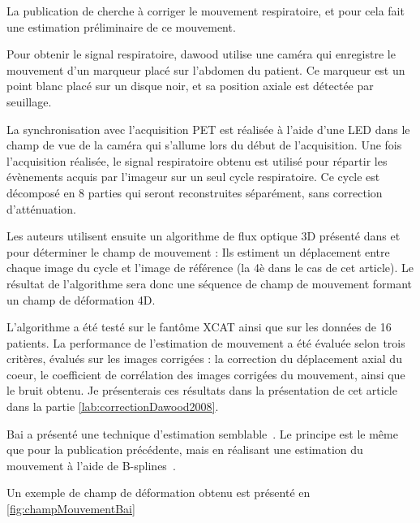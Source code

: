 La publication de \cite{dawood2008respiratory} cherche à corriger le mouvement respiratoire, et pour cela fait une estimation préliminaire de ce mouvement. 

Pour obtenir le signal respiratoire, dawood utilise une caméra qui enregistre le mouvement d'un marqueur placé sur l'abdomen du patient. Ce marqueur est un point blanc placé sur un disque noir, et sa position axiale est détectée par seuillage. 

La synchronisation avec l'acquisition PET est réalisée à l'aide d'une LED dans le champ de vue de la caméra qui s'allume lors du début de l'acquisition. Une fois l'acquisition réalisée, le signal respiratoire obtenu est utilisé pour répartir les évènements acquis par l'imageur sur un seul cycle respiratoire. Ce cycle est décomposé en 8 parties qui seront reconstruites séparément, sans correction d'atténuation. 

Les auteurs utilisent ensuite un algorithme de flux optique 3D présenté dans \cite{dawood2006lung} et \cite{horn1981determining} pour déterminer le champ de mouvement : Ils estiment un déplacement entre chaque image du cycle et l'image de référence (la 4è dans le cas de cet article). Le résultat de l'algorithme sera donc une séquence de champ de mouvement formant un champ de déformation 4D.

L'algorithme a été testé sur le fantôme XCAT ainsi que sur les données de 16 patients. La performance de l'estimation de mouvement a été évaluée selon trois critères, évalués sur les images corrigées : la correction du déplacement axial du coeur, le coefficient de corrélation des images corrigées du mouvement, ainsi que le bruit obtenu. Je présenterais ces résultats dans la présentation de cet article dans la partie \ref{lab:correctionDawood2008}.

Bai a présenté une technique d'estimation semblable~\cite{bai2009regularized}. Le principe est le même que pour la publication précédente, mais en réalisant une estimation du mouvement à l'aide de B-splines~\cite{thevenaz2000optimization}.

Un exemple de champ de déformation obtenu est présenté en \ref{fig:champMouvementBai}

